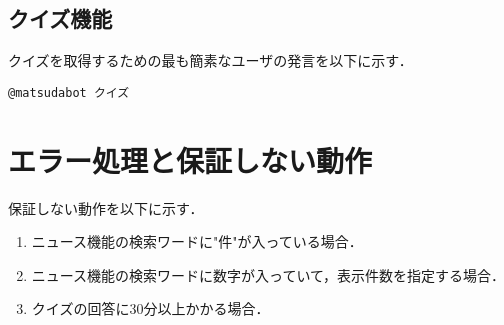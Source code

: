 \documentclass[12pt]{jsarticle}
\begin{document}
\subsection{クイズ機能}
クイズを取得するための最も簡素なユーザの発言を以下に示す．
\begin{verbatim}
@matsudabot クイズ
\end{verbatim}

\section{エラー処理と保証しない動作}
保証しない動作を以下に示す．
\begin{enumerate}
\item ニュース機能の検索ワードに"件"が入っている場合．
\item ニュース機能の検索ワードに数字が入っていて，表示件数を指定する場合．
\item クイズの回答に30分以上かかる場合．
\end{enumerate}



\end{document}
